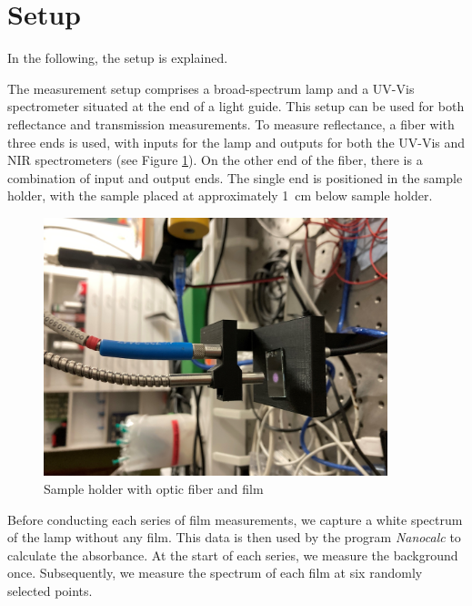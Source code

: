 \section{Setup}
\label{sec:setup}

In the following, the setup is explained. 

The measurement setup comprises a broad-spectrum lamp and a UV-Vis spectrometer situated at the end of a light guide. This setup can be used for both reflectance and transmission measurements. To measure reflectance, a fiber with three ends is used, with inputs for the lamp and outputs for both the UV-Vis and NIR spectrometers (see Figure \ref{fig:setup}). On the other end of the fiber, there is a combination of input and output ends. The single end is positioned in the sample holder, with the sample placed at approximately \SI{1}{\centi\metre} below sample holder.

\begin{figure}[ht]
    \centering
    \includegraphics[width = 10cm, angle = -90]{Bilder/Auswertung/Setup/Setup.jpg}
    \caption{Sample holder with optic fiber and film}
    \label{fig:setup}
\end{figure}

Before conducting each series of film measurements, we capture a white spectrum of the lamp without any film. This data is then used by the program \textit{Nanocalc} to calculate the absorbance. At the start of each series, we measure the background once. Subsequently, we measure the spectrum of each film at six randomly selected points.